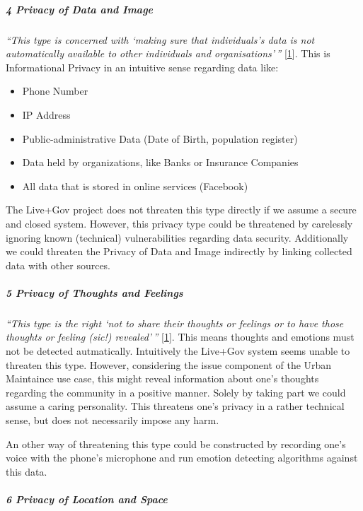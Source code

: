 \subparagraph{4 Privacy of Data and Image}

\emph{``This type is concerned with `making sure that individuals's data
is not automatically available to other individuals and
organisations'\,''} {[}\hyperref[references]{1}{]}. This is
Informational Privacy in an intuitive sense regarding data like:

\begin{itemize}
\itemsep1pt\parskip0pt
\item
  Phone Number
\item
  IP Address
\item
  Public-administrative Data (Date of Birth, population register)
\item
  Data held by organizations, like Banks or Insurance Companies
\item
  All data that is stored in online services (Facebook)
\end{itemize}

The Live+Gov project does not threaten this type directly if we assume a
secure and closed system. However, this privacy type could be threatened
by carelessly ignoring known (technical) vulnerabilities regarding data
security. Additionally we could threaten the Privacy of Data and Image
indirectly by linking collected data with other sources.

\subparagraph{5 Privacy of Thoughts and Feelings}

\emph{``This type is the right `not to share their thoughts or feelings
or to have those thoughts or feeling (sic!) revealed'\,''}
{[}\hyperref[references]{1}{]}. This means thoughts and emotions must
not be detected autmatically. Intuitively the Live+Gov system seems
unable to threaten this type. However, considering the issue component
of the Urban Maintaince use case, this might reveal information about
one's thoughts regarding the community in a positive manner. Solely by
taking part we could assume a caring personality. This threatens one's
privacy in a rather technical sense, but does not necessarily impose any
harm.

An other way of threatening this type could be constructed by recording
one's voice with the phone's microphone and run emotion detecting
algorithms against this data.

\subparagraph{6 Privacy of Location and Space}

